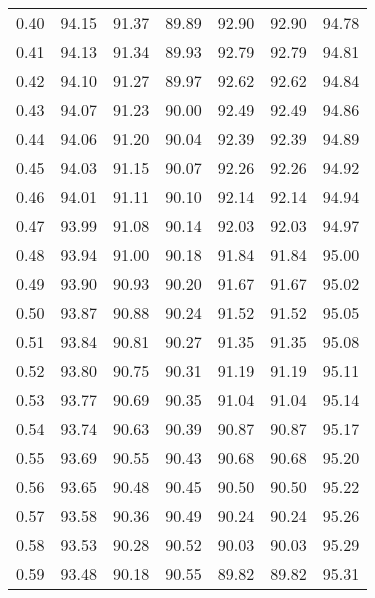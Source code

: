 \begin{tabular}{|c|c|c|c|c|c|c|}
      0.40 &     94.15 &     91.37 &      89.89 &   92.90 &      92.90 &         94.78 \\
      0.41 &     94.13 &     91.34 &      89.93 &   92.79 &      92.79 &         94.81 \\
      0.42 &     94.10 &     91.27 &      89.97 &   92.62 &      92.62 &         94.84 \\
      0.43 &     94.07 &     91.23 &      90.00 &   92.49 &      92.49 &         94.86 \\
      0.44 &     94.06 &     91.20 &      90.04 &   92.39 &      92.39 &         94.89 \\
      0.45 &     94.03 &     91.15 &      90.07 &   92.26 &      92.26 &         94.92 \\
      0.46 &     94.01 &     91.11 &      90.10 &   92.14 &      92.14 &         94.94 \\
      0.47 &     93.99 &     91.08 &      90.14 &   92.03 &      92.03 &         94.97 \\
      0.48 &     93.94 &     91.00 &      90.18 &   91.84 &      91.84 &         95.00 \\
      0.49 &     93.90 &     90.93 &      90.20 &   91.67 &      91.67 &         95.02 \\
      0.50 &     93.87 &     90.88 &      90.24 &   91.52 &      91.52 &         95.05 \\
      0.51 &     93.84 &     90.81 &      90.27 &   91.35 &      91.35 &         95.08 \\
      0.52 &     93.80 &     90.75 &      90.31 &   91.19 &      91.19 &         95.11 \\
      0.53 &     93.77 &     90.69 &      90.35 &   91.04 &      91.04 &         95.14 \\
      0.54 &     93.74 &     90.63 &      90.39 &   90.87 &      90.87 &         95.17 \\
      0.55 &     93.69 &     90.55 &      90.43 &   90.68 &      90.68 &         95.20 \\
      0.56 &     93.65 &     90.48 &      90.45 &   90.50 &      90.50 &         95.22 \\
      0.57 &     93.58 &     90.36 &      90.49 &   90.24 &      90.24 &         95.26 \\
      0.58 &     93.53 &     90.28 &      90.52 &   90.03 &      90.03 &         95.29 \\
      0.59 &     93.48 &     90.18 &      90.55 &   89.82 &      89.82 &         95.31 \\

\end{tabular}

